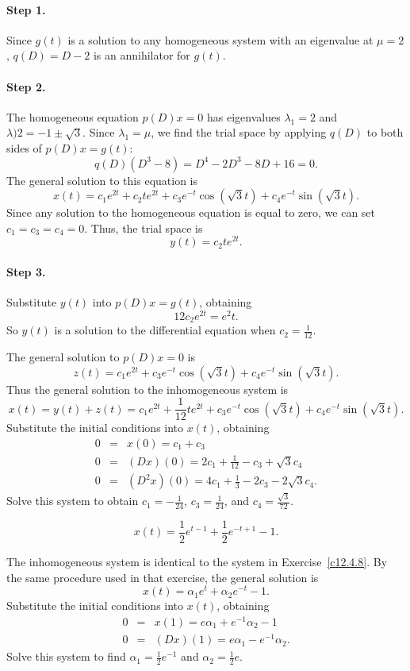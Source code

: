 \paragraph{Step 1.} Since $g(t)$ is a solution to any homogeneous
system with an eigenvalue at $\mu = 2$, $q(D) = D - 2$ is an annihilator
for $g(t)$.

\paragraph{Step 2.} The homogeneous equation $p(D)x = 0$ has eigenvalues
$\lambda_1 = 2$ and $\lambda)2 = -1 \pm \sqrt{3}$.  Since $\lambda_1 =
\mu$, we find the trial space by applying $q(D)$ to both sides of
$p(D)x = g(t)$:
\[
q(D)(D^3 - 8) = D^4 - 2D^3 - 8D + 16 = 0.
\]
The general solution to this equation is
\[
x(t) = c_1e^{2t} + c_2te^{2t} + c_3e^{-t}\cos(\sqrt{3}t)
+ c_4e^{-t}\sin(\sqrt{3}t).
\]
Since any solution to the homogeneous equation is equal to zero, we can
set $c_1 = c_3 = c_4 = 0$.  Thus, the trial space is
\[
y(t) = c_2te^{2t}.
\]
\paragraph{Step 3.} Substitute $y(t)$ into $p(D)x = g(t)$, obtaining
\[
12c_2e^{2t} = e^2t.
\]
So $y(t)$ is a solution to the differential equation when $c_2 = \frac{1}{12}$.

\para The general solution to $p(D)x = 0$ is
\[
z(t) = c_1e^{2t} + c_3e^{-t}\cos(\sqrt{3}t) + c_4e^{-t}\sin(\sqrt{3}t).
\]
Thus the general solution to the inhomogeneous system is
\[
x(t) = y(t) + z(t) = c_1e^{2t} + \frac{1}{12}te^{2t}
+ c_3e^{-t}\cos(\sqrt{3}t) + c_4e^{-t}\sin(\sqrt{3}t).
\]
Substitute the initial conditions into $x(t)$, obtaining
\[
\begin{array}{rcl}
0 & = & x(0) = c_1 + c_3 \\
0 & = & (Dx)(0) = 2c_1 + \frac{1}{12} - c_3 + \sqrt{3}c_4 \\
0 & = & (D^2x)(0) = 4c_1 + \frac{1}{3} - 2c_3 - 2\sqrt{3}c_4.
\end{array}
\]
Solve this system to obtain $c_1 = -\frac{1}{24}$, $c_3 = \frac{1}{24}$,
and $c_4 = \frac{\sqrt{3}}{72}$.

 \ans
\[
x(t) = \frac{1}{2}e^{t - 1} + \frac{1}{2}e^{-t + 1} - 1.
\]

\soln The inhomogeneous system is identical to the system in
Exercise~\ref{c12.4.8}.  By the same procedure used in that exercise,
the general solution is
\[
x(t) = \alpha_1e^t + \alpha_2e^{-t} - 1.
\]
Substitute the initial conditions into $x(t)$, obtaining
\[
\begin{array}{rcl}
0 & = & x(1) = e\alpha_1 + e^{-1}\alpha_2 - 1 \\
0 & = & (Dx)(1) = e\alpha_1 - e^{-1}\alpha_2.
\end{array}
\]
Solve this system to find $\alpha_1 = \frac{1}{2}e^{-1}$ and
$\alpha_2 = \frac{1}{2}e$.



